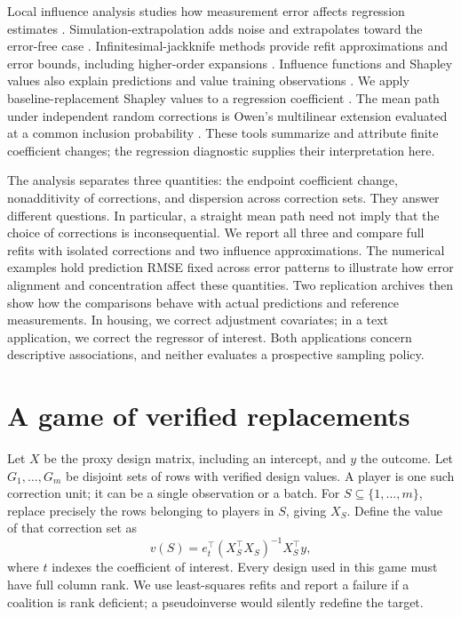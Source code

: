 \documentclass[11pt]{article}
\begin{document}
Local influence analysis studies how measurement error affects regression
estimates \citep{lee1996}. Simulation-extrapolation adds noise and extrapolates
toward the error-free case \citep{cook1994}. Infinitesimal-jackknife methods provide refit
approximations and error bounds, including higher-order expansions
\citep{giordano2019higher,giordano2019}. Influence functions and Shapley values
also explain predictions and value training observations
\citep{koh2017,ghorbani2019,karlas2024}. We apply baseline-replacement Shapley
values to a regression coefficient \citep{sundararajan2020}. The mean path
under independent random corrections is Owen's multilinear extension evaluated
at a common inclusion probability \citep{owen1972}. These tools summarize and
attribute finite coefficient changes; the regression diagnostic supplies their
interpretation here.

The analysis separates three quantities: the endpoint coefficient change,
nonadditivity of corrections, and dispersion across correction sets. They
answer different questions. In particular, a straight mean path need not imply
that the choice of corrections is inconsequential. We report all three and
compare full refits with isolated corrections and two influence approximations.
The numerical examples hold prediction RMSE fixed across error patterns to
illustrate how error alignment and concentration affect these quantities.
Two replication archives then show how the comparisons behave with actual
predictions and reference measurements. In housing, we correct adjustment
covariates; in a text application, we correct the regressor of interest. Both
applications concern descriptive associations, and neither evaluates a
prospective sampling policy.

\section{A game of verified replacements}

Let $X$ be the proxy design matrix, including an intercept, and $y$ the outcome.
Let $G_1,\ldots,G_m$ be disjoint sets of rows with verified design values.
A player is one such correction unit; it can be a single observation or a batch.
For $S\subseteq\{1,\ldots,m\}$, replace precisely the rows belonging to players
in $S$, giving $X_S$. Define the value of that correction set as
\begin{equation}
 v(S)=e_t^\top(X_S^\top X_S)^{-1}X_S^\top y,
 \label{eq:game}
\end{equation}
where $t$ indexes the coefficient of interest. Every design used in this game
must have full column rank. We use least-squares refits and report a failure if a
coalition is rank deficient; a pseudoinverse would silently redefine the target.
\end{document}
